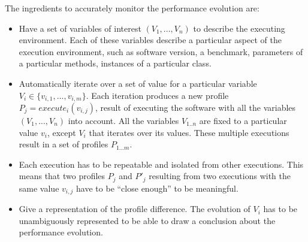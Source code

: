 \documentclass{sig-alternate}
\begin{document}
The ingredients to accurately monitor the performance evolution are:

\begin{itemize}
\item Have a set of variables of interest $(V_1, ..., V_n)$ to describe the executing environment. Each of these variables describe a particular aspect of the execution environment, such as software version, a benchmark, parameters of a particular methods, instances of a particular class. 

\item Automatically iterate over a set of value for a particular variable $V_i \in \{v_{i,1}, ..., v_{i,m}\}$. Each iteration produces a new profile $P_j = \textit{execute}_i(v_{i,j})$, result of executing the software with all the variables $(V_1, ..., V_n)$ into account. All the variables $V_{1..n}$ are fixed to a particular value $v_i$, except $V_i$ that iterates over its values. These multiple executions result in a set of profiles $P_{1...m}$. 

\item Each execution has to be repeatable and isolated from other executions. This means that two profiles $P_j$ and $P'_j$ resulting from two executions with the same value $v_{i,j}$ have to be ``close enough'' to be meaningful.

\item Give a representation of the profile difference. The evolution of $V_i$ has to be unambiguously represented to be able to draw a conclusion about the performance evolution.
\end{itemize}








\end{document}
